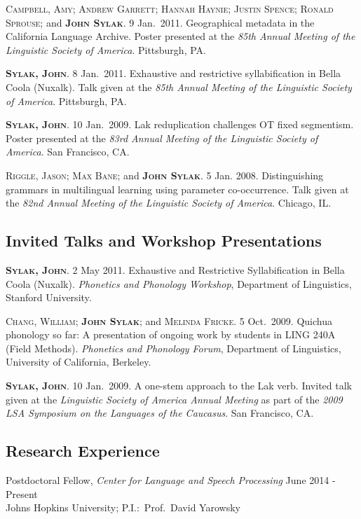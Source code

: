 \documentclass[11pt]{article}
\renewcommand{\bf}[1]{\textbf{#1}}
\newcommand{\ca}[1]{\textsc{#1}}
\renewcommand{\it}[1]{\textit{#1}}
\begin{document}
\begin{reflist}
\ca{Campbell, Amy; Andrew Garrett; Hannah Haynie; Justin Spence; Ronald Sprouse;} and \ca{\bf{John Sylak}}. 9 Jan.~2011. Geographical metadata in the California Language Archive. Poster presented at the \it{85th Annual Meeting of the Linguistic Society of America}. Pittsburgh, PA.

\ca{\bf{Sylak, John}}. 8 Jan.~2011. Exhaustive and restrictive syllabification in Bella Coola (Nuxalk). Talk given at the \it{85th Annual Meeting of the Linguistic Society of America}. Pittsburgh, PA.

\ca{\bf{Sylak, John}}. 10 Jan.~2009. Lak reduplication challenges OT fixed segmentism. Poster presented at the \it{83rd Annual Meeting of the Linguistic Society of America}. San Francisco, CA.

\ca{Riggle, Jason; Max Bane;} and \ca{\bf{John Sylak}}. 5 Jan. 2008. Distinguishing grammars in multilingual learning using parameter co-occurrence. Talk given at the \it{82nd Annual Meeting of the Linguistic Society of America}. Chicago, IL.
\end{reflist}

\subsection*{Invited Talks and Workshop Presentations}

\begin{reflist}
\ca{\bf{Sylak, John}}. 2 May 2011. Exhaustive and Restrictive Syllabification in Bella Coola (Nuxalk). \it{Phonetics and Phonology Workshop}, Department of Linguistics, Stanford University.

\ca{Chang, William; \bf{John Sylak};} and \ca{Melinda Fricke}. 5 Oct.~2009. Quichua phonology so far: A presentation of ongoing work by students in LING 240A (Field Methods). \it{Phonetics and Phonology Forum}, Department of Linguistics, University of California, Berkeley.

\ca{\bf{Sylak, John}}. 10 Jan.~2009. A one-stem approach to the Lak verb. Invited talk given at the \it{Linguistic Society of America Annual Meeting} as part of the \it{2009 LSA Symposium on the Languages of the Caucasus}. San Francisco, CA.
\end{reflist}

\subsection*{Research Experience}

Postdoctoral Fellow, \it{Center for Language and Speech Processing} \hfill June 2014 - Present \\
\noindent Johns Hopkins University; P.I.:~Prof.~David Yarowsky
\end{document}
